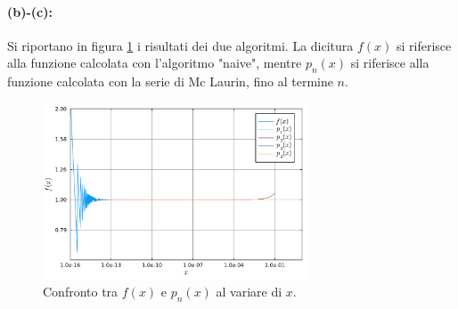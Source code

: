 \documentclass[letterpaper, 12pt]{article}
\numberwithin{equation}{section}    %
\begin{document}
\paragraph{(b)-(c):}Si riportano in figura \ref{fig:es1_4_2_1} i risultati dei due algoritmi. La dicitura $f(x)$ 
si riferisce alla funzione calcolata con l'algoritmo "naive", mentre $p_n(x)$ si riferisce alla funzione calcolata 
con la serie di Mc Laurin, fino al termine $n$.

\begin{figure}[!ht]
    \centering
    \includegraphics[width=0.7\textwidth]{1421.pdf}
    \caption{Confronto tra $f(x)$ e $p_n(x)$ al variare di $x$.}
    \label{fig:es1_4_2_1}
\end{figure}
\end{document}

